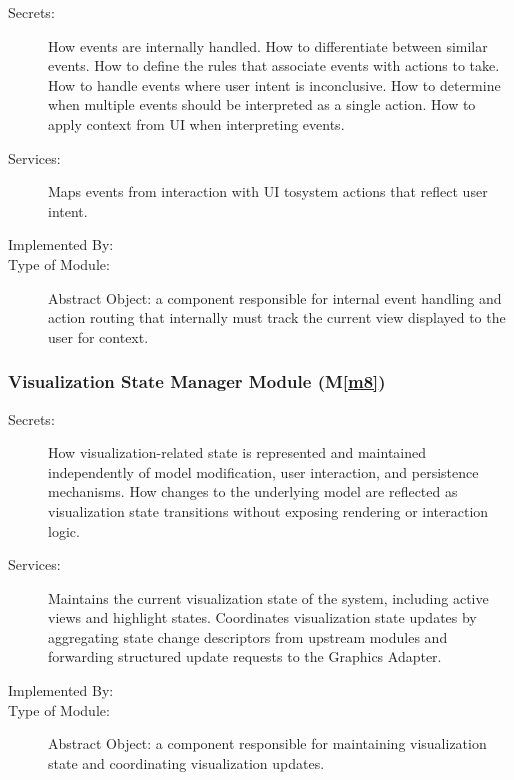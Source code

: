 \documentclass[12pt, titlepage]{article}
\newcommand{\mref}[1]{M\ref{#1}}
\begin{document}
\begin{description}
  \item[Secrets:] How events are internally handled. How to differentiate between similar events. How to define the rules that associate events with actions to take. How to handle events where user intent is inconclusive. How to determine when multiple events should be interpreted as a single action. How to apply context from UI when interpreting events.
  \item[Services:] Maps events from interaction with UI tosystem actions that reflect user intent.
  \item[Implemented By:] \progname{}
  \item[Type of Module:] Abstract Object: a component responsible for internal event handling and action routing that internally must track the current view displayed to the user for context.
\end{description}

\subsubsection{Visualization State Manager Module (\mref{m8})}


\begin{description}
\item[Secrets:] How visualization-related state is represented and maintained independently of model modification, user interaction, and persistence mechanisms. How changes to the underlying model are reflected as visualization state transitions without exposing rendering or interaction logic.
\item[Services:] Maintains the current visualization state of the system, including active views and highlight states. Coordinates visualization state updates by aggregating state change descriptors from upstream modules and forwarding structured update requests to the Graphics Adapter.
\item[Implemented By:] \progname{}
\item[Type of Module:] Abstract Object: a component responsible for maintaining visualization state and coordinating visualization updates.
\end{description}
\end{document}
